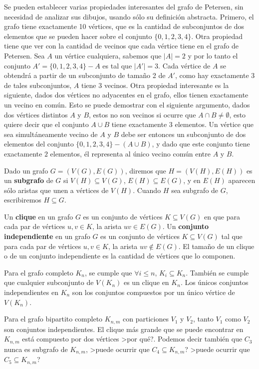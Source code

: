 \begin{ejemplo}
Se pueden establecer varias propiedades interesantes del grafo de Petersen, sin necesidad de analizar sus dibujos, usando sólo su definición abstracta.
Primero, el grafo tiene exactamente 10 vértices, que es la cantidad de subconjuntos de dos elementos que se pueden hacer sobre el conjunto $\{0,1,2,3,4\}$.
Otra propiedad tiene que ver con la cantidad de vecinos que cada vértice tiene en el grafo de Petersen.
Sea $A$ un vértice cualquiera, sabemos que $|A|=2$ y por lo tanto el conjunto $A'=\{0,1,2,3,4\}-A$ es tal que $|A'|=3$.
Cada vértice de $A$ se obtendrá a partir de un subconjunto de tamaño 2 de $A'$, como hay exactamente $3$ de tales subconjuntos, $A$ tiene $3$ vecinos.
Otra propiedad interesante es la siguiente, dados dos vértices no adyacentes en el grafo, ellos tienen exactamente un vecino en común.
Esto se puede demostrar con el siguiente argumento, dados dos vértices distintos $A$ y $B$, estos no son vecinos si ocurre que $A\cap B\not=\emptyset$, esto quiere decir que el conjunto $A\cup B$ tiene exactamente $3$ elementos.
Un vértice que sea simultáneamente vecino de $A$ y $B$ debe ser entonces un subconjunto de dos elementos del conjunto $\{0,1,2,3,4\}-(A\cup B)$, y dado que este conjunto tiene exactamente $2$ elementos, él representa al único vecino común entre $A$ y $B$.
\end{ejemplo}


\begin{definicion}
Dado un grafo $G=(V(G),E(G))$, diremos que $H=(V(H),E(H))$ es un {\bf subgrafo} de $G$ si $V(H)\subseteq V(G)$, $E(H)\subseteq E(G)$, y en $E(H)$ aparecen sólo aristas que unen a vértices de $V(H)$.
Cuando $H$ sea subgrafo de $G$, escribiremos $H\subseteq G$.

Un {\bf clique} en un grafo $G$ es un conjunto de vértices $K\subseteq V(G)$ en que para cada par de vértices $u,v\in K$, la arista $uv\in E(G)$.
Un {\bf conjunto independiente} en un grafo $G$ es un conjunto de vértices $K\subseteq V(G)$ tal que para cada par de vértices $u,v\in K$, la arista $uv\notin E(G)$.
El tamaño de un clique o de un conjunto independiente es la cantidad de vértices que lo componen.
\end{definicion}

\begin{ejemplo}
Para el grafo completo $K_n$, se cumple que $\forall i\leq n$, $K_i\subseteq K_n$.
También se cumple que cualquier subconjunto de $V(K_n)$ es un clique en $K_n$.
Los únicos conjuntos independientes en $K_n$ son los conjuntos compuestos por un único vértice de $V(K_n)$.

Para el grafo bipartito completo $K_{n,m}$ con particiones $V_1$ y $V_2$, tanto $V_1$ como $V_2$ son conjuntos independientes.
El clique más grande que se puede encontrar en $K_{n,m}$ está compuesto por dos vértices >por qué?.
Podemos decir también que $C_3$ nunca es subgrafo de $K_{n,m}$,
>puede ocurrir que $C_4\subseteq K_{n,m}$?
>puede ocurrir que $C_5\subseteq K_{n,m}$?
\end{ejemplo}

